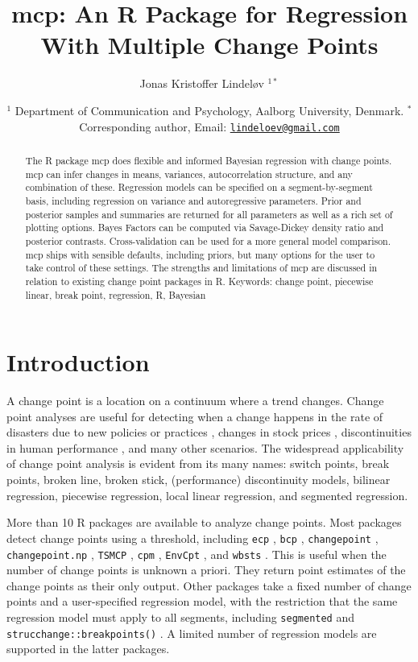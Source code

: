 \documentclass[
  american,
]{article}
\title{mcp: An R Package for Regression With Multiple Change Points}
\author{Jonas Kristoffer Lindeløv \(^{1*}\)}
\date{\(^1\) Department of Communication and Psychology, Aalborg University, Denmark.\break
\(^*\) Corresponding author, Email: \href{mailto:lindeloev@gmail.com}{\nolinkurl{lindeloev@gmail.com}}}
\begin{document}
\maketitle
\begin{abstract}
The R package mcp does flexible and informed Bayesian regression with change points. mcp can infer changes in means, variances, autocorrelation structure, and any combination of these. Regression models can be specified on a segment-by-segment basis, including regression on variance and autoregressive parameters. Prior and posterior samples and summaries are returned for all parameters as well as a rich set of plotting options. Bayes Factors can be computed via Savage-Dickey density ratio and posterior contrasts. Cross-validation can be used for a more general model comparison. mcp ships with sensible defaults, including priors, but many options for the user to take control of these settings. The strengths and limitations of mcp are discussed in relation to existing change point packages in R.
\linebreak\linebreak
Keywords: change point, piecewise linear, break point, regression, R, Bayesian
\end{abstract}

\hypertarget{introduction}{%
\section{Introduction}\label{introduction}}

A change point is a location on a continuum where a trend changes. Change point analyses are useful for detecting when a change happens in the rate of disasters due to new policies or practices \citep{raftery1986}, changes in stock prices \citep{chen1997a}, discontinuities in human performance \citep{cowan2000}, and many other scenarios. The widespread applicability of change point analysis is evident from its many names: switch points, break points, broken line, broken stick, (performance) discontinuity models, bilinear regression, piecewise regression, local linear regression, and segmented regression.

More than 10 R packages are available to analyze change points. Most packages detect change points using a threshold, including \texttt{ecp} \citep{james2015}, \texttt{bcp} \citep{erdman2007}, \texttt{changepoint} \citep{killick2014}, \texttt{changepoint.np} \citep{haynes2019}, \texttt{TSMCP} \citep{li2018}, \texttt{cpm} \citep{ross2015}, \texttt{EnvCpt} \citep{killick2018}, and \texttt{wbsts} \citep{korkas2018}. This is useful when the number of change points is unknown a priori. They return point estimates of the change points as their only output. Other packages take a fixed number of change points and a user-specified regression model, with the restriction that the same regression model must apply to all segments, including \texttt{segmented} \citep{muggeo2008} and \texttt{strucchange::breakpoints()} \citep{zeileis2003}. A limited number of regression models are supported in the latter packages.
\end{document}

